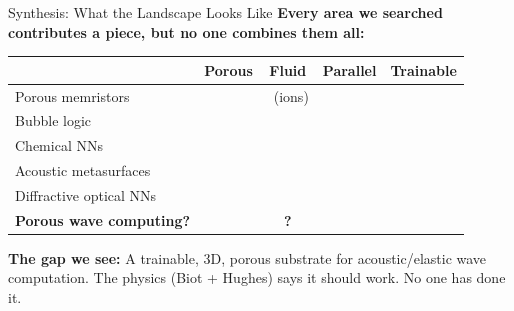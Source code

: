 \documentclass[aspectratio=169,11pt]{beamer}
\newcommand{\cmark}{\ding{51}}
\newcommand{\xmark}{\ding{55}}
\begin{document}
\begin{frame}{Synthesis: What the Landscape Looks Like}
  \textbf{Every area we searched contributes a piece, but no one combines them all:}
  \vspace{0.15cm}

  \begin{table}
    \centering
    \footnotesize
    \renewcommand{\arraystretch}{1.05}
    \begin{tabular}{@{}lcccc@{}}
      \toprule
      & \textbf{Porous} & \textbf{Fluid} & \textbf{Parallel} & \textbf{Trainable} \\
      \midrule
      Porous memristors & \cmark & \cmark\ (ions) & \xmark & \xmark \\
      Bubble logic & \xmark & \cmark & \cmark & \xmark \\
      Chemical NNs & \xmark & \cmark & \xmark & \cmark \\
      Acoustic metasurfaces & \xmark & \xmark & \xmark & \xmark \\
      Diffractive optical NNs & \xmark & \xmark & \cmark & \cmark \\
      \midrule
      \textbf{Porous wave computing?} & \textbf{\cmark} & \textbf{?} & \textbf{\cmark} & \textbf{\cmark} \\
      \bottomrule
    \end{tabular}
  \end{table}

  \vspace{0.1cm}
  {\small \textbf{The gap we see:} A trainable, 3D, porous substrate for acoustic/elastic wave computation. The physics (Biot + Hughes) says it should work. No one has done it.}
\end{frame}
\end{document}
